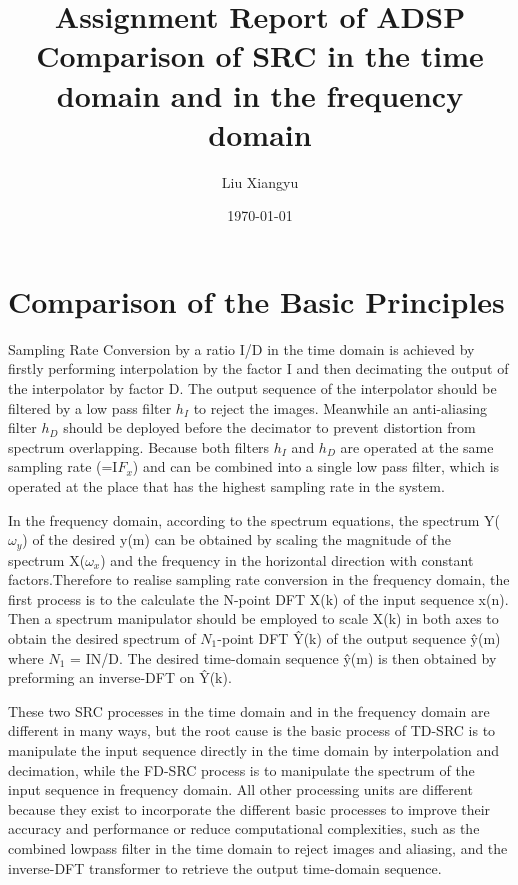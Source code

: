 \documentclass[letterpaper,12pt]{article}
\begin{document}
\title{Assignment Report of ADSP\\
	 \large Comparison of SRC in the time domain and in the frequency domain}
\author{Liu Xiangyu}
\date{\today}
\maketitle



\section{Comparison of the Basic Principles}
Sampling Rate Conversion by a ratio I/D in the time domain is achieved by firstly performing interpolation by the factor I and then decimating the output of the interpolator by factor D. The output sequence of the interpolator should be filtered by a low pass filter $h_{I}$ to reject the images. Meanwhile an anti-aliasing filter $h_{D}$ should be deployed before the decimator to prevent distortion from spectrum overlapping. Because both filters  $h_{I}$ and  $h_{D}$ are operated at the same sampling rate (=I$F_{x}$) and can be combined into a single low pass filter, which is operated at the place that has the highest sampling rate in the system. 

In the frequency domain, according to the spectrum equations, the spectrum Y($\omega_{y}$) of the desired y(m) can be obtained by scaling the magnitude of the spectrum X($\omega_{x}$) and the frequency in the horizontal direction with constant factors.Therefore to realise sampling rate conversion in the frequency domain, the first process is to the calculate the N-point DFT X(k) of the input sequence x(n). Then a spectrum manipulator should be employed to scale X(k) in both axes to obtain the desired spectrum of $N_{1}$-point DFT \^{Y}(k) of the output sequence \^{y}(m) where $N_{1}$ = IN/D. The desired time-domain sequence \^{y}(m) is then obtained by preforming an inverse-DFT on \^{Y}(k).

These two SRC processes in the time domain and in the frequency domain are different in many ways, but the root cause is the basic process of TD-SRC is to manipulate the input sequence directly in the time domain by interpolation and decimation, while the FD-SRC process is to manipulate the spectrum of the input sequence in frequency domain. All other processing units are different because they exist to incorporate the different basic processes to improve their accuracy and performance or reduce computational complexities, such as the combined lowpass filter in the time domain to reject images and aliasing, and the inverse-DFT transformer to retrieve the output time-domain sequence. 
\end{document}

